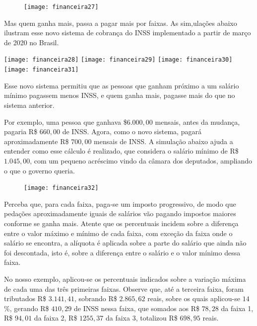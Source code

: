 \begin{figure}[H]
\centering

\texttt{[image: financeira27]}
\end{figure}

Mas quem ganha mais, passa a pagar mais por faixas. As sim,ulações abaixo ilustram esse novo sistema de cobrança do INSS implementado a partir de março de 2020 no Brasil.

\begin{multicols}{2}
\setlength{\columnsep}{-10pt}
\texttt{[image: financeira28]}
\texttt{[image: financeira29]}
\texttt{[image: financeira30]}
\texttt{[image: financeira31]}
\end{multicols}


Esse novo sistema permitiu que as pessoas que ganham próximo a um salário mínimo pagassem menos INSS, e quem ganha mais, pagasse mais do que no sistema anterior.

Por exemplo, uma pessoa que ganhava \$$6.000{,}00$ mensais, antes da mudança, pagaria R\$ $660{,}00$ de INSS. Agora, como o novo sistema, pagará aproximadamente R\$ $700{,}00$ mensais de INSS. A simulação abaixo ajuda a entender como esse cálculo é realizado, que considera o salário mínimo de R\$ $1.045{,}00$, com um pequeno acréscimo vindo da câmara dos deputados, ampliando o que o governo queria.

\begin{figure}[H]
\centering

\texttt{[image: financeira32]}
\end{figure}

Perceba que, para cada faixa, paga-se um imposto progressivo, de modo que pedações aproximadamente iguais de salários vão pagando impostos maiores conforme se ganha mais. Atente que os percentuais incidem sobre a diferença entre o valor máximo e mínimo de cada faixa, com exceção da faixa onde o salário se encontra, a alíquota é aplicada sobre a parte do salário que ainda não foi descontada, isto é, sobre a diferença entre o salário e o valor mínimo dessa faixa.

No nosso exemplo, aplicou-se os percentuais indicados sobre a variação máxima de cada uma das três primeiras faixas. Observe que, até a terceira faixa, foram tributados R\$ $3.141{,}41$, sobrando R\$ $2.865{,}62$ reais, sobre os quais aplicou-se $14$\%, gerando R\$ $410{,}29$ de INSS nessa faixa, que somados aos R\$ $78{,}28$ da faixa 1, R\$ $94{,}01$ da faixa 2, R\$ $1255{,}37$ da faixa 3, totalizou R\$ $698{,}95$ reais.

